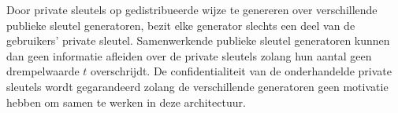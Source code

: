 Door private sleutels op gedistribueerde wijze te genereren over verschillende publieke sleutel generatoren, bezit elke generator slechts een deel van de gebruikers' private sleutel. Samenwerkende publieke sleutel generatoren kunnen dan geen informatie afleiden over de private sleutels zolang hun aantal geen drempelwaarde $t$ overschrijdt. De confidentialiteit van de onderhandelde private sleutels wordt gegarandeerd zolang de verschillende generatoren geen motivatie hebben om samen te werken in deze architectuur.

\begin{figure}[ht]
    \begin{center}
\end{center}
\end{figure}
